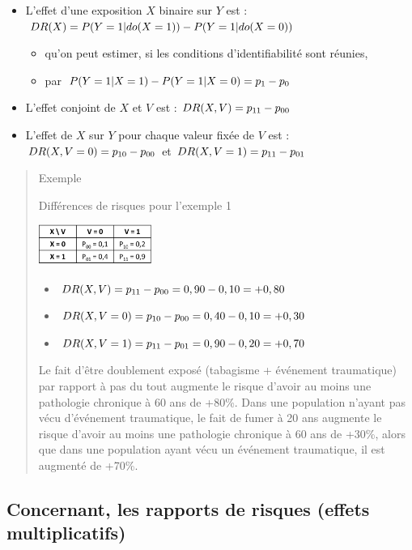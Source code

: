 \documentclass[
]{book}
\providecommand{\tightlist}{%
  \setlength{\itemsep}{0pt}\setlength{\parskip}{0pt}}
\begin{document}
\begin{itemize}
\tightlist
\item
  L'effet d'une exposition \(X\) binaire sur \(Y\) est : \(\small DR(X) = P(Y = 1|do(X = 1)) - P(Y = 1|do(X = 0))\)

  \begin{itemize}
  \tightlist
  \item
    qu'on peut estimer, si les conditions d'identifiabilité sont réunies,
  \item
    par \(\small P(Y = 1|X = 1) - P(Y = 1|X = 0) = p_1-p_0\)
  \end{itemize}
\item
  L'effet conjoint de \(X\) et \(V\) est : \(\small DR(X,V) = p_{11}-p_{00}\)
\item
  L'effet de \(X\) sur \(Y\) pour chaque valeur fixée de \(V\) est : \(\small DR(X,V=0) = p_{10}-p_{00}\) et \(\small DR(X,V=1) = p_{11}-p_{01}\)
\end{itemize}

\begin{quote}
Exemple

Différences de risques pour l'exemple 1

\includegraphics[width=0.3\textwidth,height=\textheight]{img/Image1.png}

\begin{itemize}
\tightlist
\item
  \(\small DR(X,V) = p_{11}-p_{00} = 0,90 - 0,10 = +0,80\)
\item
  \(\small DR (X,V=0) = p_{10}-p_{00} = 0,40 - 0,10 = +0,30\)
\item
  \(\small DR (X,V=1) = p_{11}-p_{01} = 0,90 - 0,20 = +0,70\)
\end{itemize}

Le fait d'être doublement exposé (tabagisme + événement traumatique) par rapport à pas du tout augmente le risque d'avoir au moins une pathologie chronique à 60 ans de +80\%. Dans une population n'ayant pas vécu d'événement traumatique, le fait de fumer à 20 ans augmente le risque d'avoir au moins une pathologie chronique à 60 ans de +30\%, alors que dans une population ayant vécu un événement traumatique, il est augmenté de +70\%.
\end{quote}

\hypertarget{concernant-les-rapports-de-risques-effets-multiplicatifs}{%
\subsection*{Concernant, les rapports de risques (effets multiplicatifs)}\label{concernant-les-rapports-de-risques-effets-multiplicatifs}}
\end{document}
